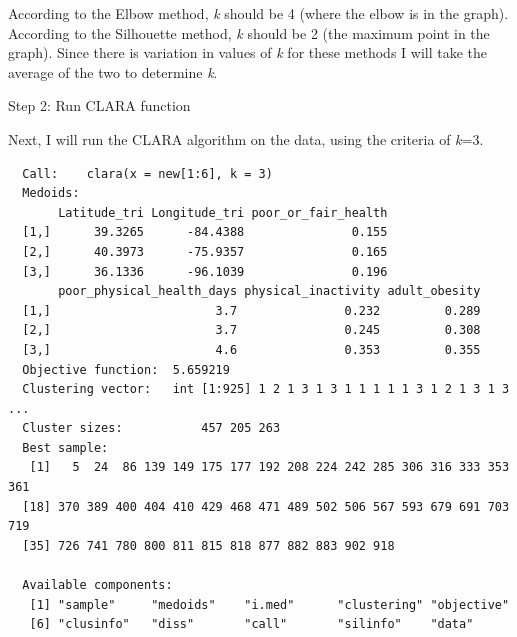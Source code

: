 \documentclass[12pt,twoside]{amherstthesis}
\begin{document}
  According to the Elbow method, \emph{k} should be 4 (where the elbow is
  in the graph). According to the Silhouette method, \emph{k} should be 2
  (the maximum point in the graph). Since there is variation in values of
  \emph{k} for these methods I will take the average of the two to
  determine \emph{k}.
  
  Step 2: Run CLARA function
  
  Next, I will run the CLARA algorithm on the data, using the criteria of
  \emph{k}=3.
  
  \begin{Shaded}
  \begin{Highlighting}[]
  \StringTok{ }\NormalTok{(new[}\OperatorTok{:}\NormalTok{], }\NormalTok{)}
  \end{Highlighting}
  \end{Shaded}
  
  \begin{Shaded}
  \begin{Highlighting}[]
  \end{Highlighting}
  \end{Shaded}
  
  \begin{verbatim}
  Call:    clara(x = new[1:6], k = 3) 
  Medoids:
       Latitude_tri Longitude_tri poor_or_fair_health
  [1,]      39.3265      -84.4388               0.155
  [2,]      40.3973      -75.9357               0.165
  [3,]      36.1336      -96.1039               0.196
       poor_physical_health_days physical_inactivity adult_obesity
  [1,]                       3.7               0.232         0.289
  [2,]                       3.7               0.245         0.308
  [3,]                       4.6               0.353         0.355
  Objective function:  5.659219
  Clustering vector:   int [1:925] 1 2 1 3 1 3 1 1 1 1 1 3 1 2 1 3 1 3 ...
  Cluster sizes:           457 205 263 
  Best sample:
   [1]   5  24  86 139 149 175 177 192 208 224 242 285 306 316 333 353 361
  [18] 370 389 400 404 410 429 468 471 489 502 506 567 593 679 691 703 719
  [35] 726 741 780 800 811 815 818 877 882 883 902 918
  
  Available components:
   [1] "sample"     "medoids"    "i.med"      "clustering" "objective" 
   [6] "clusinfo"   "diss"       "call"       "silinfo"    "data"      
  \end{verbatim}
  
\end{document}

